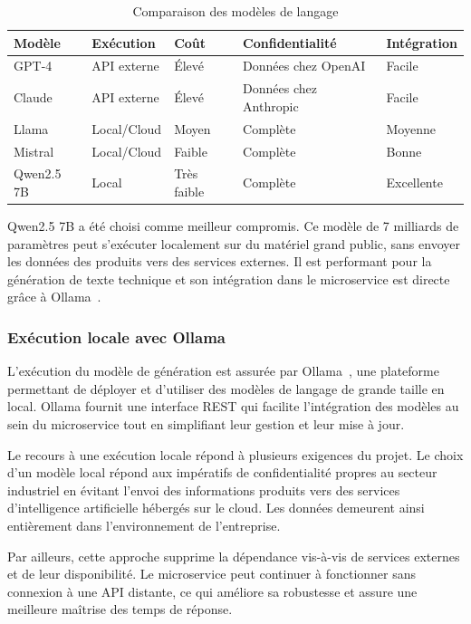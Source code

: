 \begin{table}[H]
\centering
\caption{Comparaison des modèles de langage}
\label{tab:comparaison_llm}
\renewcommand{\arraystretch}{1.4}
\begin{tabular}{|p{2.5cm}|p{2.5cm}|p{1.5cm}|p{4.7cm}|p{2.3cm}|}
\hline
\textbf{Modèle} & \textbf{Exécution} & \textbf{Coût} & \textbf{Confidentialité} & \textbf{Intégration} \\
\hline
GPT-4 & API externe & Élevé & Données chez OpenAI & Facile \\
Claude & API externe & Élevé & Données chez Anthropic & Facile \\
Llama & Local/Cloud & Moyen & Complète & Moyenne \\
Mistral & Local/Cloud & Faible & Complète & Bonne \\
Qwen2.5 7B & Local & Très faible & Complète & Excellente \\
\hline
\end{tabular}
\end{table}

Qwen2.5 7B a été choisi comme meilleur compromis. Ce modèle de 7 milliards de paramètres peut s'exécuter localement sur du matériel grand public, sans envoyer les données des produits vers des services externes. Il est performant pour la génération de texte technique et son intégration dans le microservice est directe grâce à Ollama~.

\subsubsection{Exécution locale avec Ollama}

L'exécution du modèle de génération est assurée par Ollama~, une plateforme permettant de déployer et d'utiliser des modèles de langage de grande taille en local. Ollama fournit une interface REST qui facilite l'intégration des modèles au sein du microservice tout en simplifiant leur gestion et leur mise à jour.

Le recours à une exécution locale répond à plusieurs exigences du projet. Le choix d'un modèle local répond aux impératifs de confidentialité propres au secteur industriel en évitant l'envoi des informations produits vers des services d'intelligence artificielle hébergés sur le cloud. Les données demeurent ainsi entièrement dans l'environnement de l'entreprise.

Par ailleurs, cette approche supprime la dépendance vis-à-vis de services externes et de leur disponibilité. Le microservice peut continuer à fonctionner sans connexion à une API distante, ce qui améliore sa robustesse et assure une meilleure maîtrise des temps de réponse.




